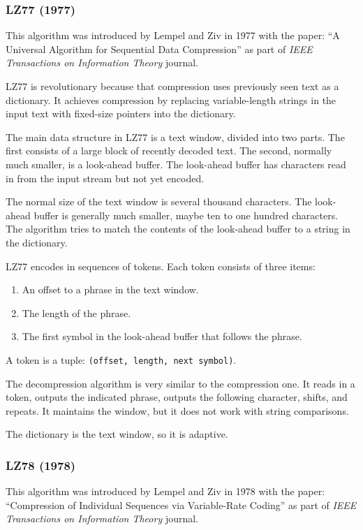 \documentclass[12pt, a4paper]{report}
\begin{document}
\subsubsection{LZ77 (1977)}

This algorithm was introduced by Lempel and Ziv in 1977 with the paper: ``A Universal Algorithm for Sequential Data Compression''
as part of \textit{IEEE Transactions on Information Theory} journal.

LZ77 is revolutionary because that compression uses previously seen text as a dictionary.
It achieves compression by replacing variable-length strings in the input text with fixed-size pointers into the dictionary.

The main data structure in LZ77 is a text window, divided into two parts.
The first consists of a large block of recently decoded text.
The second, normally much smaller, is a look-ahead buffer.
The look-ahead buffer has characters read in from the input stream but not yet encoded.

The normal size of the text window is several thousand characters.
The look-ahead buffer is generally much smaller, maybe ten to one hundred characters.
The algorithm tries to match the contents of the look-ahead buffer to a string in the dictionary.

LZ77 encodes in sequences of tokens.
Each token consists of three items:

\begin{enumerate}
  \item An offset to a phrase in the text window.
  \item The length of the phrase.
  \item The first symbol in the look-ahead buffer that follows the phrase.
\end{enumerate}

A token is a tuple: \texttt{(offset, length, next symbol)}.

The decompression algorithm is very similar to the compression one.
It reads in a token, outputs the indicated phrase, outputs the following character, shifts, and repeats.
It maintains the window, but it does not work with string comparisons.

The dictionary is the text window, so it is adaptive.

\subsubsection{LZ78 (1978)}

This algorithm was introduced by Lempel and Ziv in 1978 with the paper: ``Compression of Individual Sequences via Variable-Rate
Coding'' as part of \textit{IEEE Transactions on Information Theory} journal.
\end{document}

